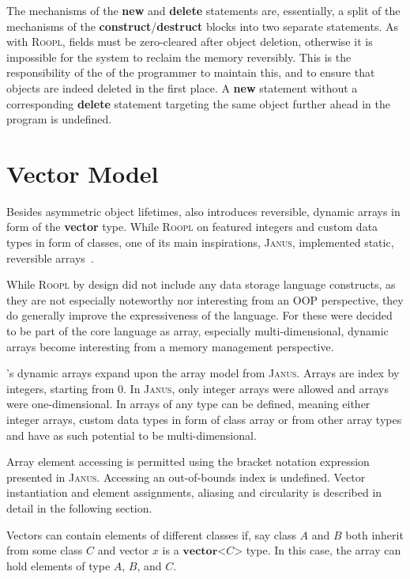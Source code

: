 The mechanisms of the \textbf{new} and \textbf{delete} statements are, essentially, a split of the mechanisms of the \textbf{construct}/\textbf{destruct} blocks into two separate statements. As with \textsc{Roopl}, fields must be zero-cleared after object deletion, otherwise it is impossible for the system to reclaim the memory reversibly. This is the responsibility of the of the programmer to maintain this, and to ensure that objects are indeed deleted in the first place. A \textbf{new} statement without a corresponding \textbf{delete} statement targeting the same object further ahead in the program is undefined.


\section{Vector Model}
\label{sec:vector-model}
Besides asymmetric object lifetimes, \rooplpp also introduces reversible, dynamic arrays in form of the \textbf{vector} type. While \textsc{Roopl} on featured integers and custom data types in form of classes, one of its main inspirations, \textsc{Janus}, implemented static, reversible arrays~\cite{rg:janus}.

While \textsc{Roopl} by design did not include any data storage language constructs, as they are not especially noteworthy nor interesting from an OOP perspective, they do generally improve the expressiveness of the language. For \rooplpp these were decided to be part of the core language as array, especially multi-dimensional, dynamic arrays become interesting from a memory management perspective.

\rooplpp's dynamic arrays expand upon the array model from \textsc{Janus}. Arrays are index by integers, starting from 0. In \textsc{Janus}, only integer arrays were allowed and arrays were one-dimensional. In \rooplpp arrays of any type can be defined, meaning either integer arrays, custom data types in form of class array or from other array types and have as such potential to be multi-dimensional. 

Array element accessing is permitted using the bracket notation expression presented in \textsc{Janus}. Accessing an out-of-bounds index is undefined.
Vector instantiation and element assignments, aliasing and circularity is described in detail in the following section.

Vectors can contain elements of different classes if, say class $A$ and $B$ both inherit from some class $C$ and vector $x$ is a $\textbf{vector}\texttt{<}C\texttt{>}$ type. In this case, the array can hold elements of type $A$, $B$, and $C$.

